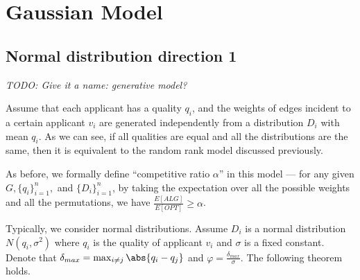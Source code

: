 \section{Gaussian Model}

\subsection{Normal distribution direction 1}

\emph{TODO: Give it a name: generative model?}



Assume that each applicant has a quality $q_i$, and the weights of edges
incident to a certain applicant $v_i$ are generated independently from
a distribution $D_i$ with mean $q_i$.
As we can see, if all qualities are equal and all the distributions are the same, then it is equivalent to the random rank model
discussed previously.

As before, we formally define ``competitive ratio $\alpha$'' in this model --- for any given $G, \{q_i\}_{i=1}^n,$ and $\{D_i\}_{i=1}^n$, by taking the expectation over all the possible weights and all the permutations, we have $\frac{E[ALG]}{E[OPT]} \ge \alpha$.







Typically, we consider normal distributions.
Assume $D_i$ is a normal distribution $N(q_i, \sigma^2)$ where
$q_i$ is the quality of applicant $v_i$ and $\sigma$ is a fixed constant.
Denote that $\delta_{max} = \max_{i \neq j} \abs{q_i - q_j}$ and
$\varphi = \frac{\delta_{max}}{\sigma}$. The following theorem holds.

